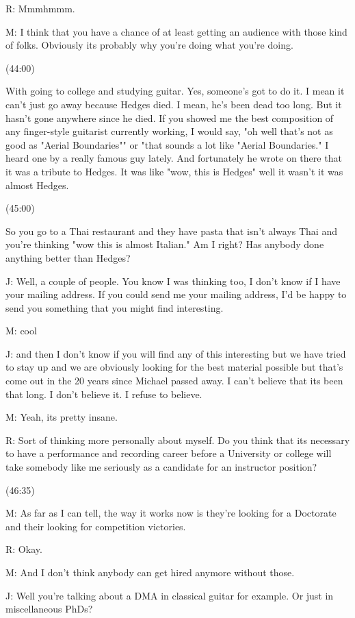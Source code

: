 \documentclass[11pt]{article}
\begin{document}
R: Mmmhmmm.

M: I think that you have a chance of at least getting an audience with those kind of folks. Obviously its probably why you're doing what you're doing. 

(44:00)

With going to college and studying guitar. Yes, someone's got to do it. I mean it can't just go away because Hedges died. I mean, he's been dead too long. But it hasn't gone anywhere since he died. If you showed me the best composition of any finger-style guitarist currently working, I would say, "oh well that's not as good as "Aerial Boundaries"" or "that sounds a lot like "Aerial Boundaries." I heard one by a really famous guy lately. And fortunately he wrote on there that it was a tribute to Hedges. It was like "wow, this is Hedges" well it wasn't it was almost Hedges. 

(45:00)

So you go to a Thai restaurant and they have pasta that isn't always Thai and you're thinking "wow this is almost Italian." Am I right? Has anybody done anything better than Hedges?

J: Well, a couple of people. You know I was thinking too, I don't know if I have your mailing address. If you could send me your mailing address, I'd be happy to send you something that you might find interesting.

M: cool

J: and then I don't know if you will find any of this interesting but we have tried to stay up and we are obviously looking for the best material possible but that's come out in the 20 years since Michael passed away. I can't believe that its been that long. I don't believe it. I refuse to believe.

M: Yeah, its pretty insane. 

R: Sort of thinking more personally about myself. Do you think that its necessary to have a performance and recording career before a University or college will take somebody like me seriously as a candidate for an instructor position?  

(46:35)

M: As far as I can tell, the way it works now is they're looking for a Doctorate and their looking for competition victories. 

R: Okay.

M: And I don't think anybody can get hired anymore without those.

J: Well you're talking about a DMA in classical guitar for example. Or just in miscellaneous PhDs?
\end{document}
